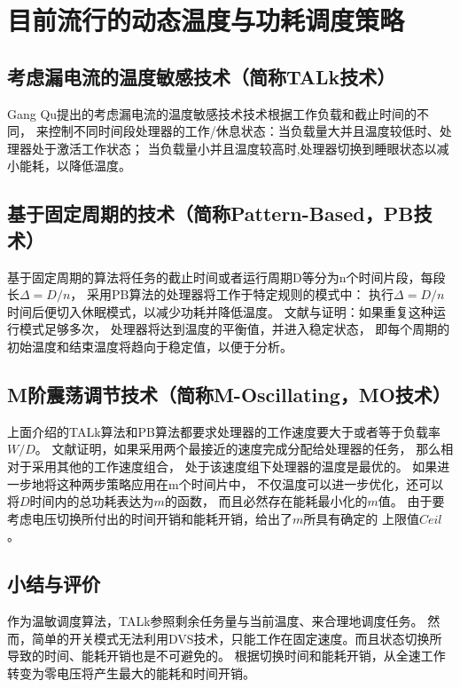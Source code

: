 \section{目前流行的动态温度与功耗调度策略}
\label{sec:algorithms}
\subsection{考虑漏电流的温度敏感技术（简称TALk技术）}
Gang Qu提出的考虑漏电流的温度敏感技术技术根据工作负载和截止时间的不同， 来控制不同时间段处理器的工作/休息状态：当负载量大并且温度较低时、处理器处于激活工作状态； 当负载量小并且温度较高时,处理器切换到睡眼状态以减小能耗，以降低温度。

\subsection{基于固定周期的技术（简称Pattern-Based，PB技术）}

基于固定周期的算法将任务的截止时间或者运行周期D等分为n个时间片段，每段长$\Delta=D/n$， 采用PB算法的处理器将工作于特定规则的模式中： 执行$\Delta=D/n$时间后便切入休眠模式，以减少功耗并降低温度。 文献与证明：如果重复这种运行模式足够多次， 处理器将达到温度的平衡值，并进入稳定状态， 即每个周期的初始温度和结束温度将趋向于稳定值，以便于分析。

\subsection{M阶震荡调节技术（简称M-Oscillating，MO技术）}

上面介绍的TALk算法和PB算法都要求处理器的工作速度要大于或者等于负载率$W/D$。 文献证明，如果采用两个最接近的速度完成分配给处理器的任务， 那么相对于采用其他的工作速度组合， 处于该速度组下处理器的温度是最优的。 如果进一步地将这种两步策略应用在m个时间片中， 不仅温度可以进一步优化，还可以将$D$时间内的总功耗表达为$m$的函数， 而且必然存在能耗最小化的$m$值。 由于要考虑电压切换所付出的时间开销和能耗开销，给出了$m$所具有确定的 上限值$Ceil$。

\subsection{小结与评价}
作为温敏调度算法，TALk参照剩余任务量与当前温度、来合理地调度任务。 然而，简单的开关模式无法利用DVS技术，只能工作在固定速度。而且状态切换所导致的时间、能耗开销也是不可避免的。 根据切换时间和能耗开销，从全速工作转变为零电压将产生最大的能耗和时间开销。

